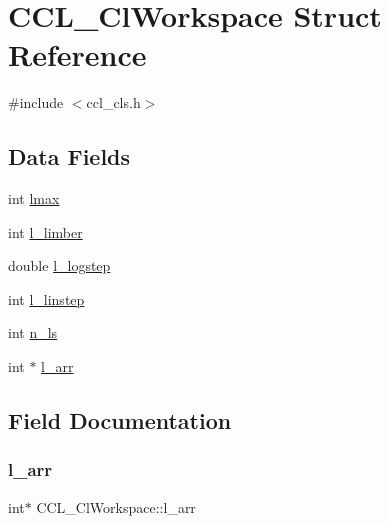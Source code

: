 \hypertarget{struct_c_c_l___cl_workspace}{}\section{C\+C\+L\+\_\+\+Cl\+Workspace Struct Reference}
\label{struct_c_c_l___cl_workspace}


{\ttfamily \#include $<$ccl\+\_\+cls.\+h$>$}

\subsection*{Data Fields}
\begin{DoxyCompactItemize}
\item 
int \mbox{\hyperlink{struct_c_c_l___cl_workspace_a2c001bf25523d5cb48cc9b3c62ee8e41}{lmax}}
\item 
int \mbox{\hyperlink{struct_c_c_l___cl_workspace_a725ffa9818f7778bec8ebeccc7dbcd06}{l\+\_\+limber}}
\item 
double \mbox{\hyperlink{struct_c_c_l___cl_workspace_a05ec77f2e9b5ee512ea3bf669f7f8da4}{l\+\_\+logstep}}
\item 
int \mbox{\hyperlink{struct_c_c_l___cl_workspace_aafdd1e870574aae96b12b3b5aebd9037}{l\+\_\+linstep}}
\item 
int \mbox{\hyperlink{struct_c_c_l___cl_workspace_a5ffe29ff75b7c14e5002c4dd87fa6bc5}{n\+\_\+ls}}
\item 
int $\ast$ \mbox{\hyperlink{struct_c_c_l___cl_workspace_af029601c9f7021df0ee80551d065bf71}{l\+\_\+arr}}
\end{DoxyCompactItemize}


\subsection{Field Documentation}
\mbox{\label{struct_c_c_l___cl_workspace_af029601c9f7021df0ee80551d065bf71}} 
\subsubsection{\texorpdfstring{l\+\_\+arr}{l\_arr}}
{\footnotesize\ttfamily int$\ast$ C\+C\+L\+\_\+\+Cl\+Workspace\+::l\+\_\+arr}

\mbox{\label{struct_c_c_l___cl_workspace_a725ffa9818f7778bec8ebeccc7dbcd06}} 
